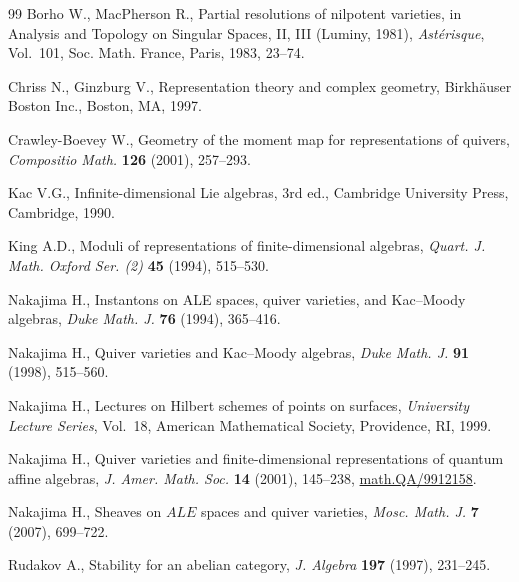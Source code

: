 \documentclass[11pt]{article}
\theoremstyle{definition}
\numberwithin{equation}{section}
\newcommand{\MR}[1]{}
\begin{document}
\begin{thebibliography}{99}
Borho W., MacPherson R.,  Partial resolutions of nilpotent varieties,
  in Analysis and Topology on Singular Spaces, II, III (Luminy, 1981),
 {\it  Ast\'erisque}, Vol.~101, Soc. Math. France, Paris, 1983,  23--74.

Chriss N., Ginzburg V.,  Representation theory and complex geometry,
  Birkh\"auser Boston Inc., Boston, MA, 1997. %

Crawley-Boevey W., Geometry of the moment map for representations of
  quivers, {\it Compositio Math.} \textbf{126} (2001),   257--293.

 Kac V.G., Inf\/inite-dimensional Lie algebras, 3rd ed., Cambridge
  University Press, Cambridge, 1990. %

 King A.D.,  Moduli of representations of f\/inite-dimensional algebras,
 {\it Quart. J. Math. Oxford Ser. (2)} \textbf{45} (1994),  515--530.

Nakajima H., Instantons on {ALE} spaces, quiver varieties, and
  Kac--Moody algebras, {\it Duke Math. J.} \textbf{76} (1994), 365--416.

Nakajima H., Quiver varieties and Kac--Moody algebras, {\it Duke Math. J.}
  \textbf{91} (1998), 515--560. %

Nakajima H., Lectures on Hilbert schemes of points on surfaces, {\it University
  Lecture Series}, Vol.~18, American Mathematical Society, Providence, RI, 1999.

Nakajima H., Quiver varieties and f\/inite-dimensional representations of
  quantum af\/f\/ine algebras, {\it J. Amer. Math. Soc.} \textbf{14} (2001),
  145--238, \href{http://arxiv.org/abs/math.QA/9912158}{math.QA/9912158}. %

Nakajima H.,  Sheaves on $ALE$ spaces and quiver varieties, {\it Mosc. Math. J.}
  \textbf{7} (2007),  699--722.

Rudakov A.,  Stability for an abelian category, {\it J. Algebra} \textbf{197}
  (1997),   231--245. %

\end{thebibliography}
\end{document}
